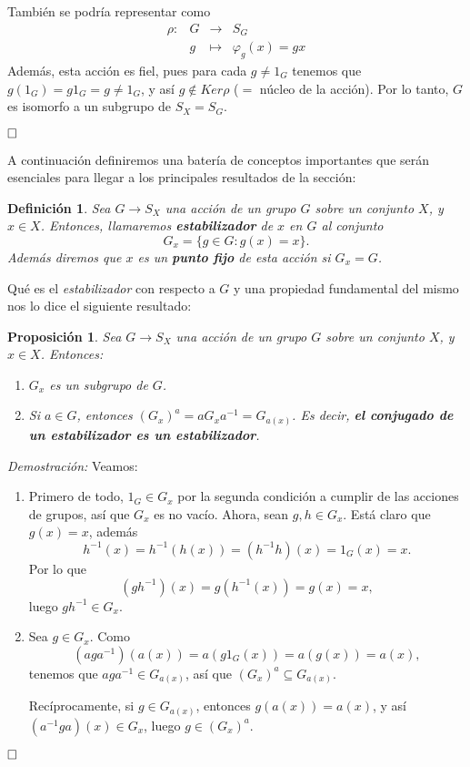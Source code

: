 \documentclass[12pt]{article}
\newtheorem{proposition}[theorem]{Proposición}
\newtheorem{definition}[theorem]{Definición}
\begin{document}
También se podría representar como $$\begin{array}{rccl}
\rho\colon &G& \longrightarrow &S_{G}\\
&g& \longmapsto &\varphi_{g}(x) = gx
\end{array}
$$ 
Además, esta acción es fiel, pues para cada $g \neq 1_{G}$ tenemos que $g(1_{G}) = g1_{G} = g \neq 1_{G}$, y así $g \notin Ker\rho$ ($=$ núcleo de la acción). Por lo tanto, $G$ es isomorfo a un subgrupo de $S_X = S_G$.

$\hfill \square$

A continuación definiremos una batería de conceptos importantes que serán esenciales para llegar a los principales resultados de la sección:

\begin{definition}Sea $G \longrightarrow S_X$ una acción de un grupo $G$ sobre un conjunto $X$, y $x \in X$. Entonces, llamaremos \textbf{estabilizador} de $x$ en $G$ al conjunto $$G_{x} = \lbrace g \in G : g(x) = x \rbrace.$$
Además diremos que $x$ es un \textbf{punto fijo} de esta acción si $G_{x} = G$.
\end{definition}

Qué es el \textit{estabilizador} con respecto a $G$ y una propiedad fundamental del mismo nos lo dice el siguiente resultado:
\begin{proposition}
Sea $G \longrightarrow S_X$ una acción de un grupo $G$ sobre un conjunto $X$, y $x \in X$. Entonces:

\begin{enumerate}
\item $G_{x}$ es un subgrupo de $G$.
\item Si $a \in G$, entonces $(G_{x})^{a} = aG_{x}a^{-1} = G_{a(x)}$. Es decir, \textbf{el conjugado de un estabilizador es un estabilizador}.
\end{enumerate}
\end{proposition}
\emph{Demostración: }Veamos:
\begin{enumerate}
\item Primero de todo, $1_{G} \in G_{x}$ por la segunda condición a cumplir de las acciones de grupos, así que $G_{x}$ es no vacío. Ahora, sean $g,h \in G_{x}$. Está claro que $g(x) = x$, además $$h^{-1} (x) = h^{-1}(h(x)) = (h^{-1}h)(x) = 1_{G}(x) = x.$$ Por lo que $$(gh^{-1})(x)= g(h^{-1}(x)) = g(x)= x,$$ luego $gh^{-1} \in G_{x}.$
\item Sea $g \in G_{x}$. Como  $$(aga^{-1})(a(x)) = a(g1_{G}(x))= a(g(x)) = a(x),$$ tenemos que $aga^{-1} \in G_{a(x)}$, así que $(G_{x})^{a} \subseteq G_{a(x)}$.

Recíprocamente, si $g \in G_{a(x)}$, entonces $g(a(x)) = a(x)$, y así $(a^{-1}ga)(x) \in G_{x}$, luego $g \in (G_{x})^{a}.$
\end{enumerate}
$\hfill \square$
\end{document}
